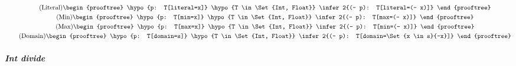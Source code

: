 \begin{gather}
  \tag{Literal}
  \begin{prooftree}
    \hypo{p: T[literal=x]}
    \hypo{T \in \Set{Int, Float}}
    \infer2{(- p): T[literal=(- x)]}
  \end{prooftree}
  \\
  \tag{Min}
  \begin{prooftree}
    \hypo{p: T[min=x]}
    \hypo{T \in \Set{Int, Float}}
    \infer2{(- p): T[max=(- x)]}
  \end{prooftree}
  \\
  \tag{Max}
  \begin{prooftree}
    \hypo{p: T[max=x]}
    \hypo{T \in \Set{Int, Float}}
    \infer2{(- p): T[min=(- x)]}
  \end{prooftree}
  \\
  \tag{Domain}
  \begin{prooftree}
    \hypo{p: T[domain=s]}
    \hypo{T \in \Set{Int, Float}}
    \infer2{(- p): T[domain=\Set{x \in s}{-x}]}
  \end{prooftree}
\end{gather}
\subparagraph{Int divide}
